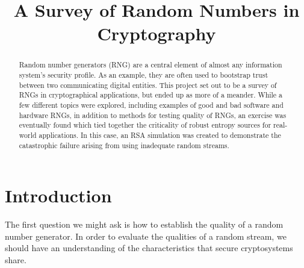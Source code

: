 \documentclass[conference]{/Users/paul/MSEE/ee595/project/report/IEEEtran/IEEEtran}
\begin{document}
%
\title{A Survey of Random Numbers in Cryptography}


\author{
}

\maketitle

\begin{abstract}
    Random number generators (RNG) are a central element of almost any information system's security profile. As an example, they are often used to bootstrap trust between two communicating digital entities. This project set out to be a survey of RNGs in cryptographical applications, but ended up as more of a meander. While a few different topics were explored, including examples of good and bad software and hardware RNGs, in addition to methods for testing quality of RNGs, an exercise was eventually found which tied together the criticality of robust entropy sources for real-world applications. In this case, an RSA simulation was created to demonstrate the catastrophic failure arising from using inadequate random streams. 
\end{abstract}

 
\section{Introduction}
    The first question we might ask is how to establish the quality of a random number generator. In order to evaluate the qualities of a random stream, we should have an understanding of the characteristics that secure cryptosystems share. 
    
\end{document}
